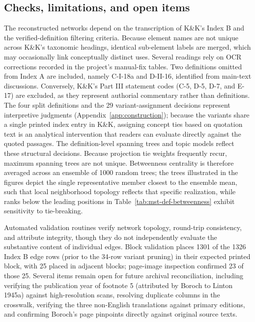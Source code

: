 \documentclass[11pt]{article}
\begin{document}
\subsection{Checks, limitations, and open items}\label{app:checks}

The reconstructed networks depend on the transcription of K\&K's Index B and the verified-definition filtering criteria. Because element names are not unique across K\&K's taxonomic headings, identical sub-element labels are merged, which may occasionally link conceptually distinct uses. Several readings rely on OCR corrections recorded in the project's manual-fix tables. Two definitions omitted from Index A are included, namely C-I-18a and D-II-16, identified from main-text discussions. Conversely, K\&K's Part III statement codes (C-5, D-5, D-7, and E-17) are excluded, as they represent authorial commentary rather than definitions. The four split definitions and the 29 variant-assignment decisions represent interpretive judgments (Appendix~\ref{app:construction}); because the variants share a single printed index entry in K\&K, assigning concept ties based on quotation text is an analytical intervention that readers can evaluate directly against the quoted passages. The definition-level spanning trees and topic models reflect these structural decisions. Because projection tie weights frequently recur, maximum spanning trees are not unique. Betweenness centrality is therefore averaged across an ensemble of 1000 random trees; the trees illustrated in the figures depict the single representative member closest to the ensemble mean, such that local neighborhood topology reflects that specific realization, while ranks below the leading positions in Table~\ref{tab:mst-def-betweenness} exhibit sensitivity to tie-breaking.

Automated validation routines verify network topology, round-trip consistency, and attribute integrity, though they do not independently evaluate the substantive content of individual edges. Block validation places 1301 of the 1326 Index B edge rows (prior to the 34-row variant pruning) in their expected printed block, with 25 placed in adjacent blocks; page-image inspection confirmed 23 of those 25. Several items remain open for future archival reconciliation, including verifying the publication year of footnote 5 (attributed by Boroch to Linton 1945a) against high-resolution scans, resolving duplicate columns in the crosswalk, verifying the three non-English translations against primary editions, and confirming Boroch's page pinpoints directly against original source texts.



\end{document}
